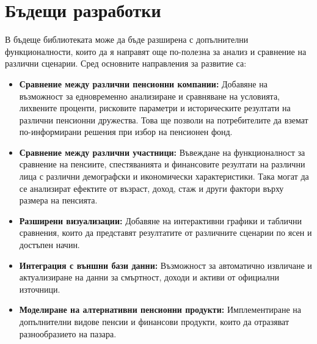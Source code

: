 \documentclass[a4paper,12pt]{article}
\begin{document}
\section{Бъдещи разработки}
В бъдеще библиотеката може да бъде разширена с допълнителни функционалности, които да я направят още по-полезна за анализ и сравнение на различни сценарии. Сред основните направления за развитие са:

\begin{itemize}
        \item \textbf{Сравнение между различни пенсионни компании:} Добавяне на възможност за едновременно анализиране и сравняване на условията, лихвените проценти, рисковите параметри и историческите резултати на различни пенсионни дружества. Това ще позволи на потребителите да вземат по-информирани решения при избор на пенсионен фонд.
        \item \textbf{Сравнение между различни участници:} Въвеждане на функционалност за сравнение на пенсиите, спестяванията и финансовите резултати на различни лица с различни демографски и икономически характеристики. Така могат да се анализират ефектите от възраст, доход, стаж и други фактори върху размера на пенсията.
        \item \textbf{Разширени визуализации:} Добавяне на интерактивни графики и таблични сравнения, които да представят резултатите от различните сценарии по ясен и достъпен начин.
        \item \textbf{Интеграция с външни бази данни:} Възможност за автоматично извличане и актуализиране на данни за смъртност, доходи и активи от официални източници.
        \item \textbf{Моделиране на алтернативни пенсионни продукти:} Имплементиране на допълнителни видове пенсии и финансови продукти, които да отразяват разнообразието на пазара.
\end{itemize}
\end{document}

